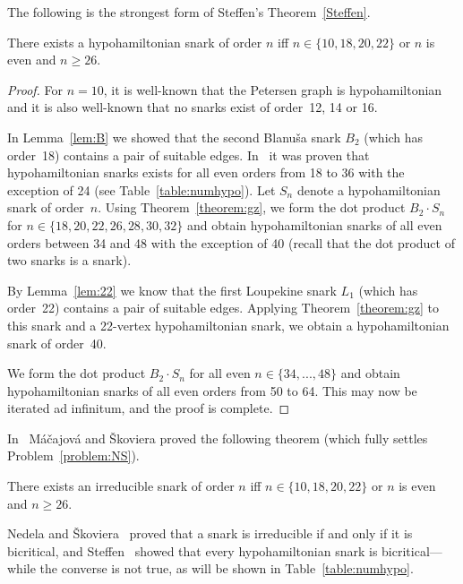 \documentclass{amcjoucc}
\begin{document}
\newpage

The following is the strongest form of Steffen's Theorem~\ref{Steffen}.

\begin{theorem}\label{thm:hyposnarks}
There exists a hypohamiltonian snark of order $n$ iff $n \in \{ 10, 18, 20, 22 \}$ or $n$ is even and $n \ge 26$.
\end{theorem}

\begin{proof}
For $n = 10$, it is well-known that the Petersen graph is hypohamiltonian and it is also well-known that no snarks exist of order~12, 14 or 16.

In Lemma~\ref{lem:B} we showed that the second Blanu\v{s}a snark $B_2$ (which has order~18) contains a pair of suitable edges. In~\cite{BGHM13} it was proven that hypohamiltonian snarks exists for all even orders from 18 to 36 with the exception of 24 (see Table~\ref{table:numhypo}). Let $S_n$ denote a hypohamiltonian snark of order~$n$. Using Theorem~\ref{theorem:gz}, we form the dot product $B_2 \cdot S_n$ for $n \in \{ 18, 20, 22, 26, 28, 30, 32 \}$ and obtain hypohamiltonian snarks of all even orders between 34 and 48 with the exception of 40 (recall that the dot product of two snarks is a snark).

By Lemma~\ref{lem:22} we know that the first Loupekine snark $L_1$ (which has order~22) contains a pair of suitable edges. Applying Theorem~\ref{theorem:gz} to this snark and a 22-vertex hypohamiltonian snark, we obtain a hypohamiltonian snark of order~40.

We form the dot product $B_2 \cdot S_n$ for all even $n \in \{ 34, ..., 48 \}$ and obtain hypohamiltonian snarks of all even orders from 50 to 64. This may now be iterated ad infinitum, and the proof is complete.
\end{proof}


In~\cite{MS06} M\'{a}\v{c}ajov\'{a} and \v{S}koviera proved the following theorem (which fully settles Problem~\ref{problem:NS}).

\begin{theorem}\label{thm:ms06}
There exists an irreducible snark of order $n$ iff $n \in \{ 10, 18, 20, 22 \}$ or $n$ is even and $n \ge 26$.
\end{theorem}


Nedela and \v{S}koviera~\cite{NS96} proved that a snark is irreducible if and only if it is bicritical, and Steffen~\cite{St98} showed that every hypohamiltonian snark is bicritical---while the converse is not true, as will be shown in Table~\ref{table:numhypo}.
\end{document}
